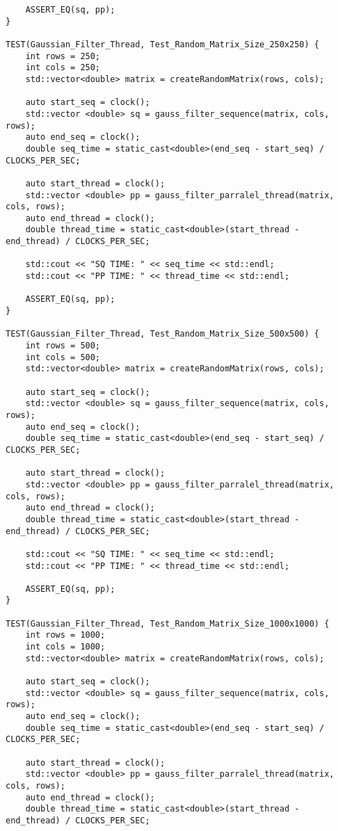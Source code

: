 \documentclass{report}
\begin{document}
\begin{lstlisting}
    ASSERT_EQ(sq, pp);
}

TEST(Gaussian_Filter_Thread, Test_Random_Matrix_Size_250x250) {
    int rows = 250;
    int cols = 250;
    std::vector<double> matrix = createRandomMatrix(rows, cols);

    auto start_seq = clock();
    std::vector <double> sq = gauss_filter_sequence(matrix, cols, rows);
    auto end_seq = clock();
    double seq_time = static_cast<double>(end_seq - start_seq) / CLOCKS_PER_SEC;

    auto start_thread = clock();
    std::vector <double> pp = gauss_filter_parralel_thread(matrix, cols, rows);
    auto end_thread = clock();
    double thread_time = static_cast<double>(start_thread - end_thread) / CLOCKS_PER_SEC;

    std::cout << "SQ TIME: " << seq_time << std::endl;
    std::cout << "PP TIME: " << thread_time << std::endl;

    ASSERT_EQ(sq, pp);
}

TEST(Gaussian_Filter_Thread, Test_Random_Matrix_Size_500x500) {
    int rows = 500;
    int cols = 500;
    std::vector<double> matrix = createRandomMatrix(rows, cols);

    auto start_seq = clock();
    std::vector <double> sq = gauss_filter_sequence(matrix, cols, rows);
    auto end_seq = clock();
    double seq_time = static_cast<double>(end_seq - start_seq) / CLOCKS_PER_SEC;

    auto start_thread = clock();
    std::vector <double> pp = gauss_filter_parralel_thread(matrix, cols, rows);
    auto end_thread = clock();
    double thread_time = static_cast<double>(start_thread - end_thread) / CLOCKS_PER_SEC;

    std::cout << "SQ TIME: " << seq_time << std::endl;
    std::cout << "PP TIME: " << thread_time << std::endl;

    ASSERT_EQ(sq, pp);
}

TEST(Gaussian_Filter_Thread, Test_Random_Matrix_Size_1000x1000) {
    int rows = 1000;
    int cols = 1000;
    std::vector<double> matrix = createRandomMatrix(rows, cols);

    auto start_seq = clock();
    std::vector <double> sq = gauss_filter_sequence(matrix, cols, rows);
    auto end_seq = clock();
    double seq_time = static_cast<double>(end_seq - start_seq) / CLOCKS_PER_SEC;

    auto start_thread = clock();
    std::vector <double> pp = gauss_filter_parralel_thread(matrix, cols, rows);
    auto end_thread = clock();
    double thread_time = static_cast<double>(start_thread - end_thread) / CLOCKS_PER_SEC;


\end{lstlisting}
\end{document}
